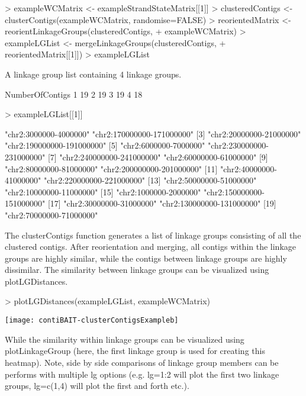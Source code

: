 \documentclass{article}
\begin{document}
\begin{Schunk}
\begin{Sinput}
> exampleWCMatrix <- exampleStrandStateMatrix[[1]]
> clusteredContigs <- clusterContigs(exampleWCMatrix, randomise=FALSE)
> reorientedMatrix <- reorientLinkageGroups(clusteredContigs,
+  exampleWCMatrix)
> exampleLGList <- mergeLinkageGroups(clusteredContigs,
+ reorientedMatrix[[1]])
> exampleLGList
\end{Sinput}
\begin{Soutput}
A linkage group list containing  4  linkage groups.

  NumberOfContigs
1              19
2              19
3              19
4              18
\end{Soutput}
\begin{Sinput}
> exampleLGList[[1]]
\end{Sinput}
\begin{Soutput}
 [1] "chr2:3000000-4000000"     "chr2:170000000-171000000"
 [3] "chr2:20000000-21000000"   "chr2:190000000-191000000"
 [5] "chr2:6000000-7000000"     "chr2:230000000-231000000"
 [7] "chr2:240000000-241000000" "chr2:60000000-61000000"  
 [9] "chr2:80000000-81000000"   "chr2:200000000-201000000"
[11] "chr2:40000000-41000000"   "chr2:220000000-221000000"
[13] "chr2:50000000-51000000"   "chr2:10000000-11000000"  
[15] "chr2:1000000-2000000"     "chr2:150000000-151000000"
[17] "chr2:30000000-31000000"   "chr2:130000000-131000000"
[19] "chr2:70000000-71000000"  
\end{Soutput}
\end{Schunk}


The clusterContigs function generates a list of linkage groups consisting of all the clustered contigs.  After reorientation and merging, all contigs within the linkage groups are highly similar, while the contigs between linkage groups are highly dissimilar.  The similarity between linkage groups can be visualized using plotLGDistances.

\begin{Schunk}
\begin{Sinput}
> plotLGDistances(exampleLGList, exampleWCMatrix)
\end{Sinput}
\end{Schunk}
\texttt{[image: contiBAIT-clusterContigsExampleb]}


While the similarity within linkage groups can be visualized using plotLinkageGroup (here, the first linkage group is used for creating this heatmap). Note, side by side comparisons of linkage group members can be performs with multiple lg options (e.g. lg=1:2 will plot the first two linkage groups, lg=c(1,4) will plot the first and forth etc.).
\end{document}
